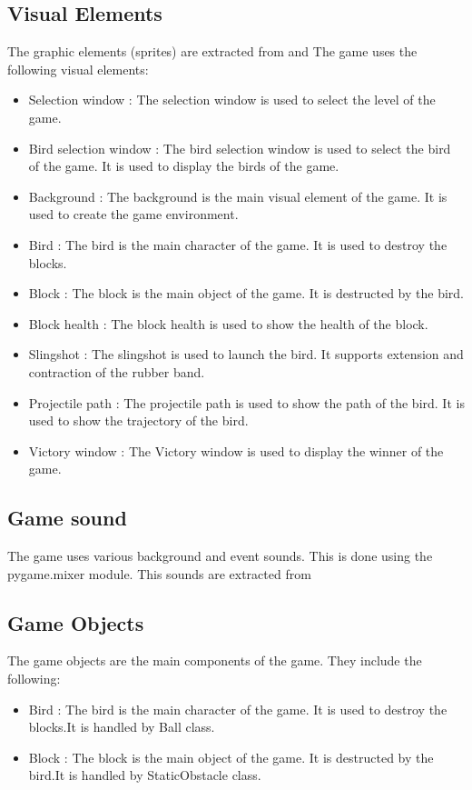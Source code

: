 \documentclass{article}
\begin{document}
\subsection{Visual Elements}
The graphic elements (sprites) are extracted from \cite{Sprites} and \cite{wiki}
The game uses the following visual elements:
\begin{itemize}
    \item Selection window : The selection window is used to select the level of the game.
    \item Bird selection window : The bird selection window is used to select the bird of the game. It is used to display the birds of the game.
    \item Background : The background is the main visual element of the game. It is used to create the game environment.
    \item Bird : The bird is the main character of the game. It is used to destroy the blocks.
    \item Block : The block is the main object of the game. It is destructed by the bird.
    \item Block health : The block health is used to show the health of the block.
    \item Slingshot : The slingshot is used to launch the bird. It supports extension and contraction of the rubber band.
    \item Projectile path : The projectile path is used to show the path of the bird. It is used to show the trajectory of the bird.
    \item Victory window : The Victory window is used to display the winner of the game.
\end{itemize}

\subsection{Game sound}
The game uses various background and event sounds.
This is done using the pygame.mixer module. This sounds are extracted from \cite{Sounds}

\subsection{Game Objects}
The game objects are the main components of the game. They include the following:
\begin{itemize}
    \item Bird : The bird is the main character of the game. It is used to destroy the blocks.It is handled by Ball class.
    \item Block : The block is the main object of the game. It is destructed by the bird.It is handled by StaticObstacle class.
\end{itemize}
\pagebreak
\end{document}
